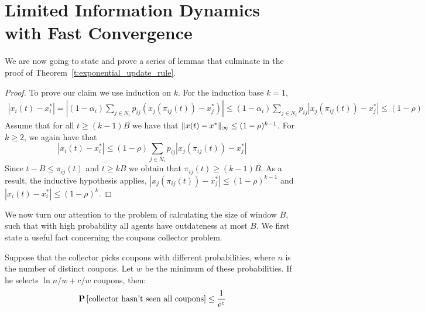 \section{Limited Information Dynamics with Fast Convergence}\label{app:s:cc_convergence}
We are now going to state and prove a series of lemmas that culminate in
the proof of Theorem~\ref{t:exponential_update_rule}.

\begin{proof}
  To prove our claim we use induction on $k$. For the induction base $k=1$,
  \begin{align*}
    |x_i(t) - x_i^*|
    =
    |(1-\alpha_i)\sum_{j \in N_i}p_{ij}(x_j(\pi_{ij}(t)) -x_j^*)|
    \leq
    (1-\alpha_i)\sum_{j \in N_i}p_{ij}|x_j(\pi_{ij}(t))-x_j^*|\leq (1-\rho)
  \end{align*}
  Assume that for all $t\geq (k-1)B$ we have that $\| x(t)-x^* \|_{\infty}\leq (1-\rho)^{k-1}$.
  For $k\geq 2$, we again have that
  \[|x_i(t) - x_i^*|\leq (1-\rho)\sum_{j \in N_i}p_{ij}|x_j(\pi_{ij}(t))-x_j^*|\]
  Since $t-B \leq \pi_{ij}(t)$ and $t \geq kB$ we obtain that $\pi_{ij}(t) \geq (k-1)B$.
  As a result, the inductive hypothesis applies, $|x_j(\pi_{ij}(t))-x_j^*| \leq (1-\rho)^{k-1}$
  and $|x_i(t) - x_i^*|\leq (1-\rho)^k$.
\end{proof}

We now turn our attention to
the problem of calculating the size of window $B$, such that with high probability
all agents have outdateness at most $B$.
We first state a useful fact concerning the coupons collector problem.

\begin{lemma}\label{l:coupons_lemma}
Suppose that the collector picks coupons with different
probabilities, where $n$ is the number of distinct coupons.
Let $w$ be the minimum of these probabilities.
If he selects $\ln n/w+ c/w$ coupons, then:
\[
\bm{\mathrm{P}}\left[\text{collector hasn't seen all coupons}\right] \leq \frac{1}{\mathrm{e}^c}
\]
\end{lemma}

